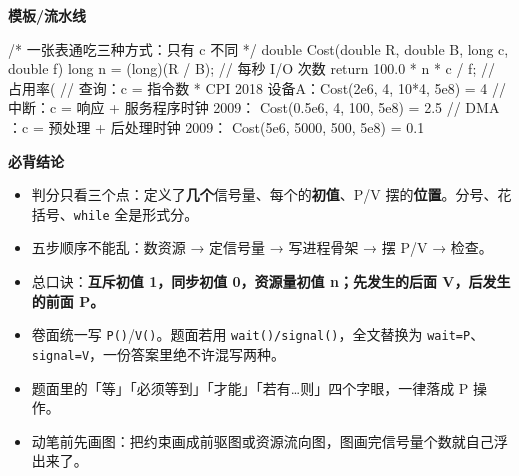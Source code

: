 \documentclass[10pt,a4paper]{ctexart}
\begin{document}
\textbf{模板/流水线}

\begin{codebox}
/* 一张表通吃三种方式：只有 c 不同 */
double Cost(double R, double B, long c, double f) {
    long n = (long)(R / B);              // 每秒 I/O 次数
    return 100.0 * n * c / f;            // 占用率(%
}
// 查询：c = 指令数 * CPI           2018 设备A：Cost(2e6, 4, 10*4, 5e8) = 4%
// 中断：c = 响应 + 服务程序时钟    2009：   Cost(0.5e6, 4, 100, 5e8) = 2.5%
// DMA ：c = 预处理 + 后处理时钟    2009：   Cost(5e6, 5000, 500, 5e8) = 0.1%
\end{codebox}





\textbf{必背结论}

\begin{itemize}

\item 判分只看三个点：定义了\textbf{几个}信号量、每个的\textbf{初值}、P/V 摆的\textbf{位置}。分号、花括号、\texttt{while} 全是形式分。

\item 五步顺序不能乱：数资源 → 定信号量 → 写进程骨架 → 摆 P/V → 检查。

\item 总口诀：\textbf{互斥初值 1，同步初值 0，资源量初值 n；先发生的后面 V，后发生的前面 P。}

\item 卷面统一写 \texttt{P()}/\texttt{V()}。题面若用 \texttt{wait()/signal()}，全文替换为 \texttt{wait=P}、\texttt{signal=V}，一份答案里绝不许混写两种。

\item 题面里的「等」「必须等到」「才能」「若有…则」四个字眼，一律落成 P 操作。

\item 动笔前先画图：把约束画成前驱图或资源流向图，图画完信号量个数就自己浮出来了。

\end{itemize}
\end{document}
